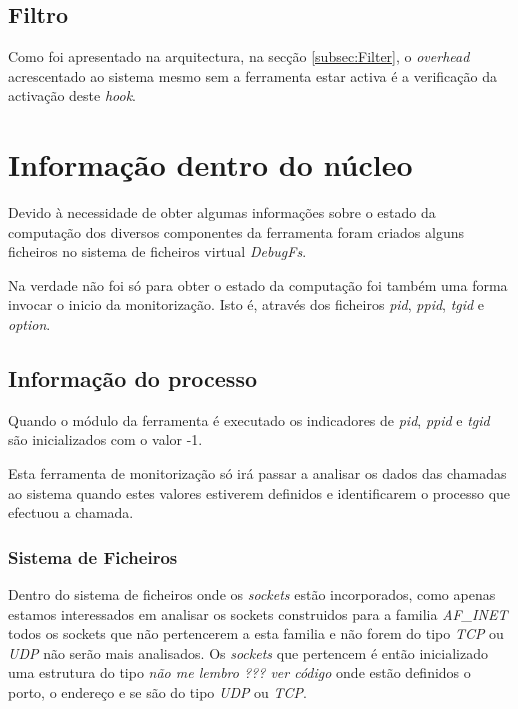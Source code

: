 \subsection{Filtro}

Como foi apresentado na arquitectura, na secção \ref{subsec:Filter}, o
\textit{overhead} acrescentado ao sistema mesmo sem a ferramenta estar activa é
a verificação da activação deste \textit{hook}.

\section{Informação dentro do núcleo}

Devido à necessidade de obter algumas informações sobre o estado da computação
dos diversos componentes da ferramenta foram criados alguns ficheiros no
sistema de ficheiros virtual \textit{DebugFs}.

Na verdade não foi só para obter o estado da computação foi também uma forma
invocar o inicio da monitorização. Isto é, através dos ficheiros \textit{pid},
\textit{ppid}, \textit{tgid} e \textit{option}. 

\subsection{Informação do processo}

Quando o módulo da ferramenta é executado os indicadores de \textit{pid},
\textit{ppid} e \textit{tgid} são inicializados com o valor -1.

Esta ferramenta de monitorização só irá passar a analisar os dados das chamadas
ao sistema quando estes valores estiverem definidos e identificarem o processo
que efectuou a chamada.

\subsubsection{Sistema de Ficheiros}

Dentro do sistema de ficheiros onde os \textit{sockets} estão incorporados,
como apenas estamos interessados em analisar os sockets construidos para a
familia \textit{AF\_INET} todos os sockets que não pertencerem a esta familia e
não forem do tipo \textit{TCP} ou \textit{UDP} não serão mais analisados. Os
\textit{sockets} que pertencem é então inicializado uma estrutura do tipo
\textit{não me lembro ??? ver código} onde estão definidos o porto, o endereço
e se são do tipo \textit{UDP} ou \textit{TCP}.

